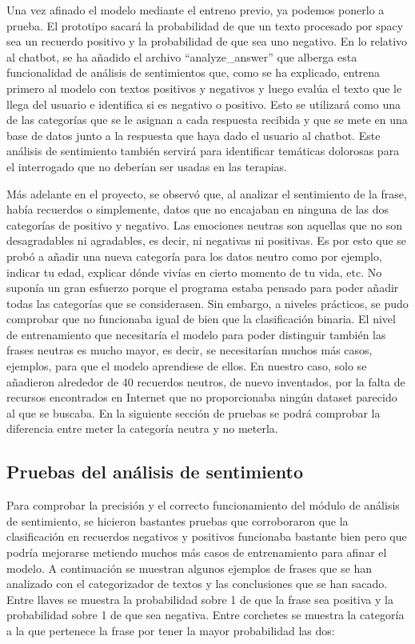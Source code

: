 Una vez afinado el modelo mediante el entreno previo, ya podemos ponerlo a prueba. El prototipo sacará la probabilidad de que un texto procesado por spacy sea un recuerdo positivo y la probabilidad de que sea uno negativo. En lo relativo al chatbot, se ha añadido el archivo ``analyze\_answer'' que alberga esta funcionalidad de análisis de sentimientos que, como se ha explicado, entrena primero al modelo con textos positivos y negativos y luego evalúa el texto que le llega del usuario e identifica si es negativo o positivo. Esto se utilizará como una de las categorías que se le asignan a cada respuesta recibida y que se mete en una base de datos junto a la respuesta que haya dado el usuario al chatbot. Este análisis de sentimiento también servirá para identificar temáticas dolorosas para el interrogado que no deberían ser usadas en las terapias.

Más adelante en el proyecto, se observó que, al analizar el sentimiento de la frase, había recuerdos o simplemente, datos que no encajaban en ninguna de las dos categorías de positivo y negativo. Las emociones neutras son aquellas que no son desagradables ni agradables, es decir, ni negativas ni positivas. Es por esto que se probó a añadir una nueva categoría para los datos neutro como por ejemplo, indicar tu edad, explicar dónde vivías en cierto momento de tu vida, etc. No suponía un gran esfuerzo porque el programa estaba pensado para poder añadir todas las categorías que se considerasen. Sin embargo, a niveles prácticos, se pudo comprobar que no funcionaba igual de bien que la clasificación binaria. El nivel de entrenamiento que necesitaría el modelo para poder distinguir también las frases neutras es mucho mayor, es decir, se necesitarían muchos más casos, ejemplos, para que el modelo aprendiese de ellos. En nuestro caso, solo se añadieron alrededor de 40 recuerdos neutros, de nuevo inventados, por la falta de recursos encontrados en Internet que no proporcionaba ningún dataset parecido al que se buscaba. En la siguiente sección de pruebas se podrá comprobar la diferencia entre meter la categoría neutra y no meterla. 

\subsection{Pruebas del análisis de sentimiento}

Para comprobar la precisión y el correcto funcionamiento del módulo de análisis de sentimiento, se hicieron bastantes pruebas que corroboraron que la clasificación en recuerdos negativos y positivos funcionaba bastante bien pero que podría mejorarse metiendo muchos más casos de entrenamiento para afinar el modelo. A continuación se muestran algunos ejemplos de frases que se han analizado con el categorizador de textos y las conclusiones que se han sacado. Entre llaves se muestra la probabilidad sobre 1 de que la frase sea positiva y la probabilidad sobre 1 de que sea negativa. Entre corchetes se muestra la categoría a la que pertenece la frase por tener la mayor probabilidad las dos:

